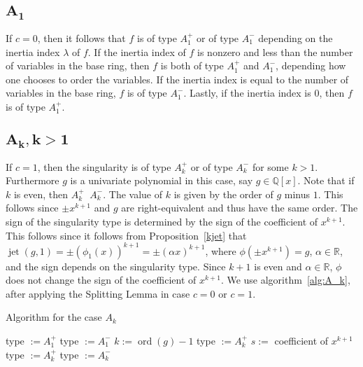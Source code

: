 \documentclass[noend]{amsproc}
\DeclareMathOperator{\ord}{ord}
\DeclareMathOperator{\requiv}{\overset{r}{\sim}}
\DeclareMathOperator{\jet}{jet}
\begin{document}
\subsection{$\boldsymbol{A_1}$}
If $c = 0$, then it follows  that $f$ is of type
$A_1^+$ or of type $A_1^-$ depending on the inertia index $\lambda$ of $f$. If
the inertia index of $f$ is nonzero and less than the number of variables in
the base ring, then $f$ is both of type $A_1^+$ and $A_1^-$, depending how one
chooses to order the variables. If the inertia index is equal to the number of
variables in the base ring, $f$ is of type $A_1^-$. Lastly, if the inertia
index is $0$, then $f$ is of type $A_1^+$.

\subsection{$\boldsymbol{A_k, k > 1}$}
If $c=1$, then the singularity is of type
$A_k^+$ or of type $A_k^-$ for some $k>1$. Furthermore $g$ is a univariate
polynomial in this case, say $g\in\mathbb Q[x]$. Note that if $k$ is even, then
$A_k^+\requiv A_k^-$. The value of $k$ is given by the order of $g$ minus $1$.
This follows since $\pm x^{k+1}$ and $g$ are right-equivalent and thus have the
same order. The sign of the singularity type is determined by the sign of the
coefficient of $x^{k+1}$. This follows since it follows from
Proposition~\ref{kjet}
that $\jet(g,1)=\pm(\phi_1(x))^{k+1}=\pm(\alpha x)^{k+1}$, where $\phi(\pm
x^{k+1})=g$, $\alpha\in\mathbb R$, and the sign depends on the singularity
type.  Since $k+1$ is even and $\alpha\in\mathbb R$, $\phi$ does not change the
sign of the coefficient of $x^{k+1}$. We use algorithm~\ref{alg:A_k}, after
applying the Splitting Lemma in case $c=0$ or $c=1$.

\begin{algorithm}[h]
\caption{\label{alg:A_k} Algorithm for the case $A_k$}
\begin{algorithmic}[1]



\STATE type $:=A_1^+$
\ELSE
\STATE type $:=A_1^-$
\ENDIF
\ENDIF
{}
\STATE $k:= \ord(g)-1$
\STATE type $:=A_k^+$
\ELSE
\STATE $s:=$ coefficient of $x^{k+1}$
\STATE type $:=A_k^+$
\ELSE
\STATE type $:=A_k^-$
\ENDIF
\ENDIF
\ENDIF
{}

\end{algorithmic}
\end{algorithm}
\end{document}
